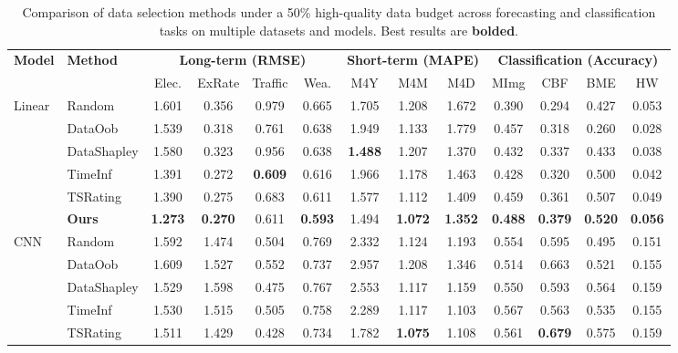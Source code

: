 \documentclass{article}
\begin{document}
\begin{table}[t]
  \caption{Comparison of data selection methods under a 50\% high-quality data budget across forecasting and classification tasks on multiple datasets and models. Best results are \textbf{bolded}.}
  \label{tab:all_tasks}
  \centering
  \footnotesize
  \setlength{\tabcolsep}{2.8pt}
  \begin{tabular}{l l | c c c c | c c c | c c c c}
    \toprule
    \textbf{Model} & \textbf{Method} &
    \multicolumn{4}{c|}{\textbf{Long-term (RMSE)}} &
    \multicolumn{3}{c|}{\textbf{Short-term (MAPE)}} &
    \multicolumn{4}{c}{\textbf{Classification (Accuracy)}} \\
    & &
    Elec. & ExRate & Traffic & Wea. &
    M4Y & M4M & M4D &
    MImg & CBF & BME & HW \\
    \midrule
    \multirow{5}{*}{Linear}
        & Random      & 1.601 & 0.356 & 0.979 & 0.665 & 1.705 & 1.208 & 1.672 & 0.390 & 0.294 & 0.427 & 0.053 \\
        & DataOob     & 1.539 & 0.318 & 0.761 & 0.638 & 1.949 & 1.133 & 1.779 & 0.457 & 0.318 & 0.260 & 0.028 \\
        & DataShapley & 1.580 & 0.323 & 0.956 & 0.638 & \textbf{1.488} & 1.207 & 1.370 & 0.432 & 0.337 & 0.433 & 0.038 \\
        & TimeInf     & 1.391 & 0.272 & \textbf{0.609} & 0.616 & 1.966 & 1.178 & 1.463 & 0.428 & 0.320 & 0.500 & 0.042 \\
        & TSRating    & 1.390 & 0.275 & 0.683 & 0.611 & 1.577 & 1.112 & 1.409 & 0.459 & 0.361 & 0.507 & 0.049 \\
        \rowcolor{cyan!10}
        & \textbf{Ours} & \textbf{1.273} & \textbf{0.270} & 0.611 & \textbf{0.593} & 1.494 & \textbf{1.072} & \textbf{1.352} & \textbf{0.488} & \textbf{0.379} & \textbf{0.520} & \textbf{0.056} \\
    \midrule
    \multirow{5}{*}{CNN}
        & Random      & 1.592 & 1.474 & 0.504 & 0.769 & 2.332 & 1.124 & 1.193 & 0.554 & 0.595 & 0.495 & 0.151 \\
        & DataOob     & 1.609 & 1.527 & 0.552 & 0.737 & 2.957 & 1.208 & 1.346 & 0.514 & 0.663 & 0.521 & 0.155 \\
        & DataShapley & 1.529 & 1.598 & 0.475 & 0.767 & 2.553 & 1.117 & 1.159 & 0.550 & 0.593 & 0.564 & 0.159 \\
        & TimeInf     & 1.530 & 1.515 & 0.505 & 0.758 & 2.289 & 1.117 & 1.103 & 0.567 & 0.563 & 0.535 & 0.155 \\
        & TSRating    & 1.511 & 1.429 & 0.428 & 0.734 & 1.782 & \textbf{1.075} & 1.108 & 0.561 & \textbf{0.679} & 0.575 & 0.159 \\

\end{tabular}
\end{table}
\end{document}
